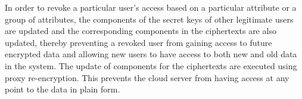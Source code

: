 In order to revoke a particular user's access based on a particular attribute or a group of attributes, the components of the secret keys of other legitimate users are updated and the corresponding components in the ciphertexts are also updated, thereby preventing a revoked user from gaining access to future encrypted data and allowing new users to have access to both new and old data in the system. The update of components for the ciphertexts are executed using proxy re-encryption. This prevents the cloud server from having access at any point to the data in plain form.
